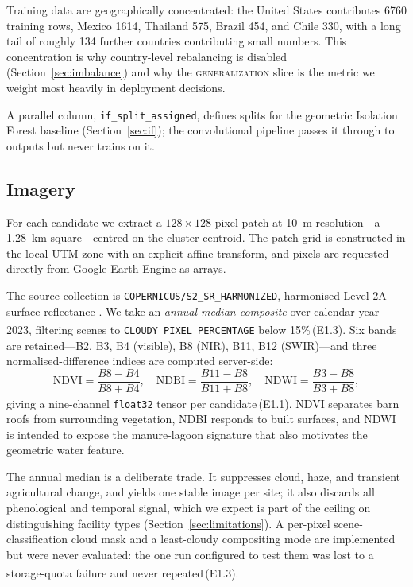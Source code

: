 \documentclass[11pt,a4paper]{article}
\newcommand{\code}[1]{\texttt{\small #1}}
\newcommand{\unablated}[1]{\textsuperscript{\dag}\,(#1)}
\begin{document}
Training data are geographically concentrated: the United States contributes
\num{6760} training rows, Mexico \num{1614}, Thailand 575, Brazil 454, and Chile
330, with a long tail of roughly 134 further countries contributing small
numbers. This concentration is why country-level rebalancing is disabled
(Section~\ref{sec:imbalance}) and why the \textsc{generalization} slice is the
metric we weight most heavily in deployment decisions.

A parallel column, \code{if\_split\_assigned}, defines splits for the geometric
Isolation Forest baseline (Section~\ref{sec:if}); the convolutional pipeline
passes it through to outputs but never trains on it.

\subsection{Imagery}
\label{sec:imagery}

For each candidate we extract a \(128 \times 128\) pixel patch at \SI{10}{\metre}
resolution---a \SI{1.28}{\kilo\metre} square---centred on the cluster centroid.
The patch grid is constructed in the local UTM zone with an explicit affine
transform, and pixels are requested directly from Google Earth Engine
\citep{gorelick2017gee} as arrays.

The source collection is \code{COPERNICUS/S2\_SR\_HARMONIZED}, harmonised
Level-2A surface reflectance \citep{mainknorn2017sen2cor}. We take an
\emph{annual median composite} over calendar year 2023, filtering scenes to
\code{CLOUDY\_PIXEL\_PERCENTAGE} below 15\%\unablated{E1.3}. Six bands are
retained---B2, B3, B4 (visible), B8 (NIR), B11, B12 (SWIR)---and three
normalised-difference indices are computed server-side:
\[
  \mathrm{NDVI}=\frac{B8-B4}{B8+B4},\quad
  \mathrm{NDBI}=\frac{B11-B8}{B11+B8},\quad
  \mathrm{NDWI}=\frac{B3-B8}{B3+B8},
\]
giving a nine-channel \code{float32} tensor per candidate\unablated{E1.1}. NDVI
separates barn roofs from surrounding vegetation, NDBI responds to built
surfaces, and NDWI is intended to expose the manure-lagoon signature that also
motivates the geometric water feature.

The annual median is a deliberate trade. It suppresses cloud, haze, and
transient agricultural change, and yields one stable image per site; it also
discards all phenological and temporal signal, which we expect is part of the
ceiling on distinguishing facility types (Section~\ref{sec:limitations}). A
per-pixel scene-classification cloud mask and a least-cloudy compositing mode
are implemented but were never evaluated: the one run configured to test them
was lost to a storage-quota failure and never repeated\unablated{E1.3}.
\end{document}
